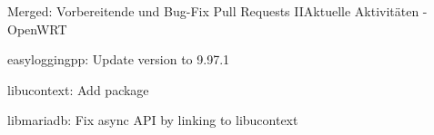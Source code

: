 ﻿\begin{frame}{\alert{Merged:} Vorbereitende und Bug-Fix Pull Requests II}{Aktuelle Aktivitäten - OpenWRT}
  \begin{description}
    \item [openwrt/packages] easyloggingpp: Update version to 9.97.1\\\href{https://github.com/openwrt/packages/pull/21637}{}
    \item [openwrt/packages] libucontext: Add package\\\href{https://github.com/openwrt/packages/pull/21933}{}
    \item [openwrt/packages] libmariadb: Fix async API by linking to libucontext\\\href{https://github.com/openwrt/packages/pull/22011}{}
  \end{description}
\end{frame}
